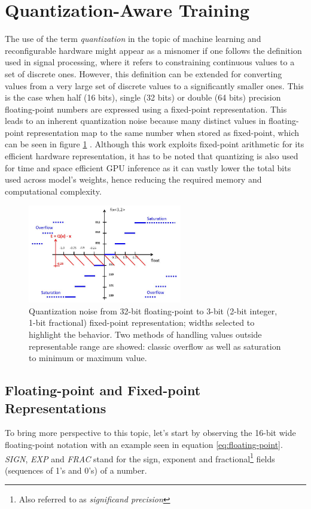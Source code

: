 \section{Quantization-Aware Training}
The use of the term \textit{quantization} in the topic of machine learning and reconfigurable hardware might appear as a misnomer if one follows the definition used in signal processing, where it refers to constraining continuous values to a set of discrete ones. However, this definition can be extended for converting values from a very large set of discrete values to a 
significantly smaller ones. This is the case when half (16 bits), single (32 bits) or double (64 bits) precision floating-point numbers are expressed using a fixed-point representation. This leads to an inherent quantization noise because many distinct values in floating-point representation map to the same number when stored as fixed-point, which can be seen in figure \ref{fig:float-to-fixed} \cite{76-shaumontfixed}. Although this work exploits fixed-point arithmetic for its efficient hardware representation, it has to be noted that quantizing is also used for time and space efficient GPU inference as it can vastly lower the total bits used across model's weights, hence reducing the required memory and computational complexity.

\begin{figure}[hpt!]
  \centering
  \includegraphics[trim={0cm 0cm 0cm 0cm}, width=0.6\textwidth, center]{models/float_to_fixed.jpg}
  \caption{Quantization noise from 32-bit floating-point to 3-bit (2-bit integer, 1-bit fractional) fixed-point representation; widths selected to highlight the behavior. Two methods of handling values outside representable range are showed: classic overflow as well as saturation to minimum or maximum value.}
  \label{fig:float-to-fixed}
\end{figure}

\subsection{Floating-point and Fixed-point Representations}
To bring more perspective to this topic, let's start by observing the 16-bit wide floating-point notation with an example seen in equation \ref{eq:floating-point}. \textit{SIGN}, \textit{EXP} and \textit{FRAC} stand for the sign, exponent and fractional\footnote{Also referred to as \textit{significand precision}} fields (sequences of 1's and 0's) of a number.

